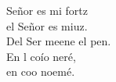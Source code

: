 \begin{cancion}%
	 Señor es mi fortz\\
	el Señor es miuz.\\
	Del Ser meene el pen. \\
	En l coío neré,\\
	en  coo noemé. \\
\end{cancion}%
